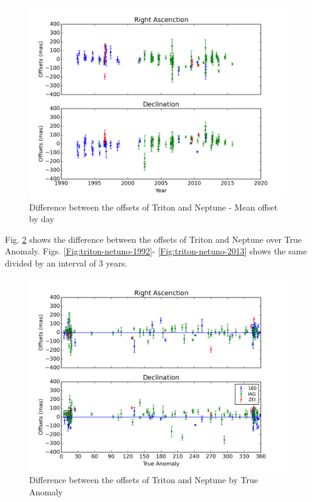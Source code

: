 \documentclass[12pt,a4paper]{report}
\begin{document}
\begin{figure}
\includegraphics[width=15.0cm]{Triton-Neptune.png} 
\caption{Difference between the offsets of Triton and Neptune - Mean offset by day}
\label{Fig:triton-netuno-mean}
\end{figure}

Fig. \ref{Fig:triton-netuno-anom} shows the difference between the offsets of Triton and Neptune over True Anomaly. Figs. \ref{Fig:triton-netuno-1992}- \ref{Fig:triton-netuno-2013} shows the same divided by an interval of 3 years.

\begin{figure}
\includegraphics[width=14.0cm]{Anom_TN.png} 
\caption{Difference between the offsets of Triton and Neptune by True Anomaly}
\label{Fig:triton-netuno-anom}
\end{figure}
\end{document}
